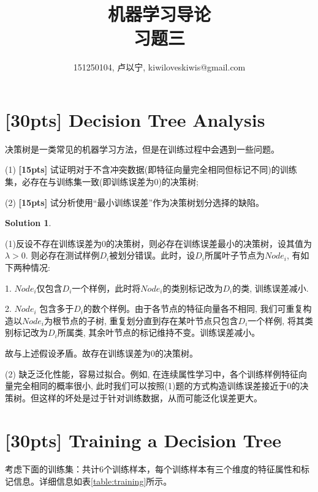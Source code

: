 \documentclass[a4paper,UTF8]{article}
\numberwithin{equation}{section}
\theoremstyle{definition}
\newtheorem*{solution}{Solution}
\begin{document}
\title{机器学习导论\\
习题三}
\author{151250104, 卢以宁, kiwiloveskiwis@gmail.com}
\maketitle
\section{[30pts] Decision Tree Analysis}
决策树是一类常见的机器学习方法，但是在训练过程中会遇到一些问题。

(1) \textbf{[15pts]} 试证明对于不含冲突数据(即特征向量完全相同但标记不同)的训练集，必存在与训练集一致(即训练误差为0)的决策树; 

(2) \textbf{[15pts]} 试分析使用“最小训练误差”作为决策树划分选择的缺陷。
\begin{solution} \,

(1)反设不存在训练误差为0的决策树，则必存在训练误差最小的决策树，设其值为$\lambda > 0$. 则必存在测试样例$D_i$被划分错误。此时，设$D_i$所属叶子节点为$Node_i$, 有如下两种情况:

1. $Node_i$仅包含$D_i$一个样例，此时将$Node_i$的类别标记改为$D_i$的类, 训练误差减小. 

2. $Node_i$ 包含多于$D_i$的数个样例。由于各节点的特征向量各不相同, 我们可重复构造以$Node_i$为根节点的子树, 重复划分直到存在某叶节点只包含$D_i$一个样例,  将其类别标记改为$D_i$所属类,  其余叶节点的标记维持不变。训练误差减小。

故与上述假设矛盾。故存在训练误差为0的决策树。

(2) 缺乏泛化性能，容易过拟合。例如, 在连续属性学习中，各个训练样例特征向量完全相同的概率很小, 此时我们可以按照(1)题的方式构造训练误差接近于0的决策树。但这样的坏处是过于针对训练数据，从而可能泛化误差更大。

\end{solution}

\section{[30pts] Training a Decision Tree}
考虑下面的训练集：共计6个训练样本，每个训练样本有三个维度的特征属性和标记信息。详细信息如表\ref{table:training}所示。
\end{document}
